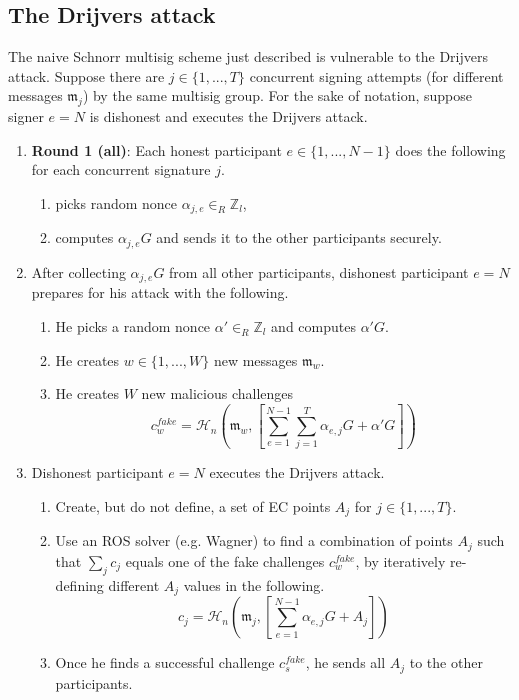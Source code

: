 \subsection*{The Drijvers attack}

The naive Schnorr multisig scheme just described is vulnerable to the Drijvers attack. Suppose there are $j \in \{1,...,T\}$ concurrent signing attempts (for different messages $\mathfrak{m}_j$) by the same multisig group. For the sake of notation, suppose signer $e = N$ is dishonest and executes the Drijvers attack.

\begin{enumerate}
    \item \textbf{Round 1 (all)}: Each honest participant $e \in \{1,...,N-1\}$ does the following for each concurrent signature $j$.
    \begin{enumerate}
        \item picks random nonce $\alpha_{j,e} \in_R \mathbb{Z}_l$,
        \item computes $\alpha_{j,e} G$ and sends it to the other participants securely.
    \end{enumerate}

    \item After collecting $\alpha_{j,e} G$ from all other participants, dishonest participant $e = N$ prepares for his attack with the following.
    \begin{enumerate}
        \item He picks a random nonce $\alpha' \in_R \mathbb{Z}_l$ and computes $\alpha' G$.
        \item He creates $w \in \{1,...,W\}$ new messages $\mathfrak{m}_w$.
        \item He creates $W$ new malicious challenges
        \[ c^{fake}_w = \mathcal{H}_n(\mathfrak{m}_w,[\sum^{N-1}_{e=1} \sum^T_{j=1} \alpha_{e,j} G + \alpha' G]) \]
    \end{enumerate}

    \item Dishonest participant $e = N$ executes the Drijvers attack.
    \begin{enumerate}
        \item Create, but do not define, a set of EC points $A_j$ for $j \in \{1,...,T\}$.
        \item Use an ROS solver (e.g. Wagner) to find a combination of points $A_j$ such that $\sum_j c_j$ equals one of the fake challenges $c^{fake}_w$, by iteratively re-defining different $A_j$ values in the following.
        \[ c_j = \mathcal{H}_n(\mathfrak{m}_j,[\sum^{N-1}_{e=1} \alpha_{e,j} G + A_j]) \]
        \item Once he finds a successful challenge $c^{fake}_{s}$, he sends all $A_j$ to the other participants.
    \end{enumerate}


\end{enumerate}
